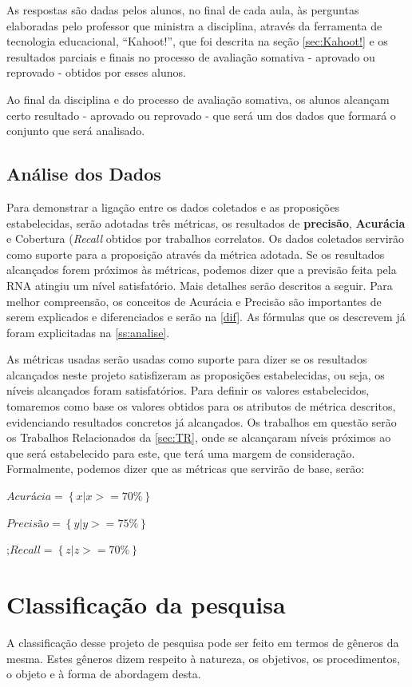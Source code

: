 As respostas são dadas pelos alunos, no final de cada aula, às perguntas elaboradas pelo professor que ministra a disciplina, através da ferramenta de tecnologia educacional, ``Kahoot!'', que foi descrita na seção \ref{sec:Kahoot!} e os resultados parciais e finais no processo de avaliação somativa - aprovado ou reprovado - obtidos por esses alunos.

Ao final da disciplina e do processo de avaliação somativa, os alunos alcançam certo resultado - aprovado ou reprovado - que será um dos dados que formará o conjunto que será analisado.

\subsection{Análise dos Dados}
Para demonstrar a ligação entre os dados coletados e as proposições estabelecidas, serão adotadas três métricas, os resultados de \textbf{precisão}, \textbf{Acurácia} e Cobertura (\textit{Recall} obtidos por trabalhos correlatos. Os dados coletados servirão como suporte para a proposição através da métrica adotada. Se os resultados alcançados forem próximos às métricas, podemos dizer que a previsão feita pela RNA atingiu um nível satisfatório. Mais detalhes serão descritos a seguir. Para melhor compreensão, os conceitos de Acurácia e Precisão são importantes de serem explicados e diferenciados e serão na \autoref{dif}. As fórmulas que os descrevem já foram explicitadas na \autoref{ss:analise}.

As métricas usadas serão usadas como suporte para dizer se os resultados alcançados neste projeto satisfizeram as proposições estabelecidas, ou seja, os níveis alcançados foram satisfatórios. Para definir os valores estabelecidos, tomaremos como base os valores obtidos para os atributos de métrica descritos, evidenciando resultados concretos já alcançados. Os trabalhos em questão serão os Trabalhos Relacionados da \autoref{sec:TR}, onde se alcançaram níveis próximos ao que será estabelecido para este, que terá uma margem de consideração. Formalmente, podemos dizer que as métricas que servirão de base, serão:

$Acurácia = \left \{ x | x >= 70\% \right \}$

$Precisão = \left \{ y | y >= 75\% \right \}$

;$Recall = \left \{ z | z >= 70\% \right \}$

\section{Classificação da pesquisa}
\label{sec:classif}
A classificação desse projeto de pesquisa pode ser feito em termos de gêneros da mesma. Estes gêneros dizem respeito à natureza, os objetivos, os procedimentos, o objeto e à forma de abordagem desta.

